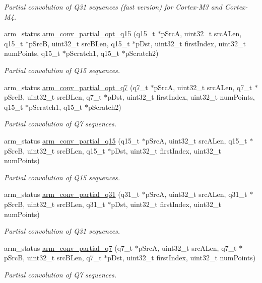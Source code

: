 \begin{DoxyCompactItemize}
\begin{DoxyCompactList}\small\item\em Partial convolution of Q31 sequences (fast version) for Cortex-\/\+M3 and Cortex-\/\+M4. \end{DoxyCompactList}\item 
arm\+\_\+status \hyperlink{group__PartialConv_ga834b23b4ade8682beeb55778399101f8}{arm\+\_\+conv\+\_\+partial\+\_\+opt\+\_\+q15} (q15\+\_\+t $\ast$p\+SrcA, uint32\+\_\+t src\+A\+Len, q15\+\_\+t $\ast$p\+SrcB, uint32\+\_\+t src\+B\+Len, q15\+\_\+t $\ast$p\+Dst, uint32\+\_\+t first\+Index, uint32\+\_\+t num\+Points, q15\+\_\+t $\ast$p\+Scratch1, q15\+\_\+t $\ast$p\+Scratch2)
\begin{DoxyCompactList}\small\item\em Partial convolution of Q15 sequences. \end{DoxyCompactList}\item 
arm\+\_\+status \hyperlink{group__PartialConv_ga3707e16af1435b215840006a7ab0c98f}{arm\+\_\+conv\+\_\+partial\+\_\+opt\+\_\+q7} (q7\+\_\+t $\ast$p\+SrcA, uint32\+\_\+t src\+A\+Len, q7\+\_\+t $\ast$p\+SrcB, uint32\+\_\+t src\+B\+Len, q7\+\_\+t $\ast$p\+Dst, uint32\+\_\+t first\+Index, uint32\+\_\+t num\+Points, q15\+\_\+t $\ast$p\+Scratch1, q15\+\_\+t $\ast$p\+Scratch2)
\begin{DoxyCompactList}\small\item\em Partial convolution of Q7 sequences. \end{DoxyCompactList}\item 
arm\+\_\+status \hyperlink{group__PartialConv_ga209a2a913a0c5e5679c5988da8f46b03}{arm\+\_\+conv\+\_\+partial\+\_\+q15} (q15\+\_\+t $\ast$p\+SrcA, uint32\+\_\+t src\+A\+Len, q15\+\_\+t $\ast$p\+SrcB, uint32\+\_\+t src\+B\+Len, q15\+\_\+t $\ast$p\+Dst, uint32\+\_\+t first\+Index, uint32\+\_\+t num\+Points)
\begin{DoxyCompactList}\small\item\em Partial convolution of Q15 sequences. \end{DoxyCompactList}\item 
arm\+\_\+status \hyperlink{group__PartialConv_ga78e73a5f02d103168a09821fb461e77a}{arm\+\_\+conv\+\_\+partial\+\_\+q31} (q31\+\_\+t $\ast$p\+SrcA, uint32\+\_\+t src\+A\+Len, q31\+\_\+t $\ast$p\+SrcB, uint32\+\_\+t src\+B\+Len, q31\+\_\+t $\ast$p\+Dst, uint32\+\_\+t first\+Index, uint32\+\_\+t num\+Points)
\begin{DoxyCompactList}\small\item\em Partial convolution of Q31 sequences. \end{DoxyCompactList}\item 
arm\+\_\+status \hyperlink{group__PartialConv_ga8567259fe18396dd972242c41741ebf4}{arm\+\_\+conv\+\_\+partial\+\_\+q7} (q7\+\_\+t $\ast$p\+SrcA, uint32\+\_\+t src\+A\+Len, q7\+\_\+t $\ast$p\+SrcB, uint32\+\_\+t src\+B\+Len, q7\+\_\+t $\ast$p\+Dst, uint32\+\_\+t first\+Index, uint32\+\_\+t num\+Points)
\begin{DoxyCompactList}\small\item\em Partial convolution of Q7 sequences. \end{DoxyCompactList}\end{DoxyCompactItemize}


